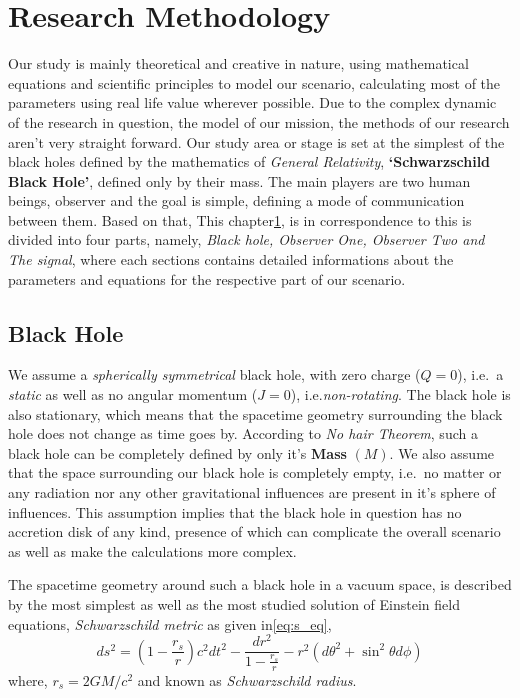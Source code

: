 \chapter{Research Methodology}\label{chp:research-methodology}

Our study is mainly theoretical and creative in nature, using mathematical equations and scientific principles to model our scenario, calculating most 
of the parameters using real life value wherever possible. Due to the complex dynamic of the research in question, the model of our mission, the methods
of our research aren't very straight forward. Our study area or stage is set at the simplest of the black holes defined by the mathematics of \emph{General
Relativity}, \textbf{`Schwarzschild Black Hole'}, defined only by their mass. The main players are two human beings, observer and the goal is simple, defining
a mode of communication between them. 
Based on that, This chapter\ref{chp:research-methodology}, is in correspondence to this is divided into four parts, namely, \emph{Black hole, Observer 
One, Observer Two and The signal}, where each sections contains detailed informations about the parameters and equations for the respective part of our 
scenario. 

\section{Black Hole}\label{sec:BH}

We assume a \emph{spherically symmetrical} black hole, with zero charge (\(Q = 0\)), i.e.~a \emph{static} as well as no angular momentum (\(J = 0\)), 
i.e.\emph{non-rotating}. The black hole is also stationary, which means that the spacetime geometry surrounding the black hole does not change as time
goes by. According to \emph{No hair Theorem}, such a black hole can be completely defined by only it's \textbf{Mass} \((M)\). We also assume that the
space surrounding our black hole is completely empty, i.e.~no matter or any radiation nor any other gravitational influences are present in it's sphere of 
influences. This assumption implies that the black hole in question has no accretion disk of any kind, presence of which can complicate the overall scenario
as well as make the calculations more complex. 

The spacetime geometry around such a black hole in a vacuum space, is described by the most simplest as well as the most studied solution of Einstein field 
equations, \emph{Schwarzschild metric} as given in\ref{eq:s_eq}, 
\begin{equation}
    ds^2  = (1 - \frac{r_s}{r})c^2dt^2 - \frac{dr^2}{1 - \frac{r_s}{r}} - r^2(d\theta^2 + \sin^2\theta d \phi) \tag{1.1}
\end{equation}
where, \(r_s = 2GM/c^2\) and known as \textit{Schwarzschild radius}.


